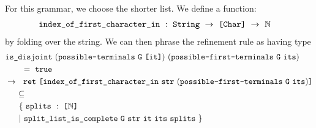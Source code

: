    For this grammar, we choose the shorter list.  We define a function:
\begin{align*}
&\texttt{index\_of\_first\_character\_in}~:~\texttt{String}~\to~\texttt{[}\texttt{Char}\texttt{]}~\to~\mathbb{N}
\end{align*}
   by folding over the string.  We can then phrase the refinement rule as having type
\begin{align*}
&\fname{is\_disjoint}~(\fname{possible-terminals}~\farg{G}~\valuelist{\farg{it}})~(\fname{possible-first-terminals}~\farg{G}~\farg{its}) \\
& \qquad=~\true \\
&\to~~\fname{ret}~\valuelist{\fname{index\_of\_first\_character\_in}~\farg{str}~(\fname{possible-first-terminals}~\farg{G}~\farg{its})} \\
&\phantom{\to~}\subseteq \\
&\ndcompfor[\phantom{\to~~}]{\farg{it}}{\farg{its}}
\end{align*}
     \label{sec:reflective-comp-first-mention}%
    \newcommand{\refAtReflectiveCompLoc}{at the end of \autoref{sec:reflective-comp-first-mention}}
%
%
%
%
%  
%  
